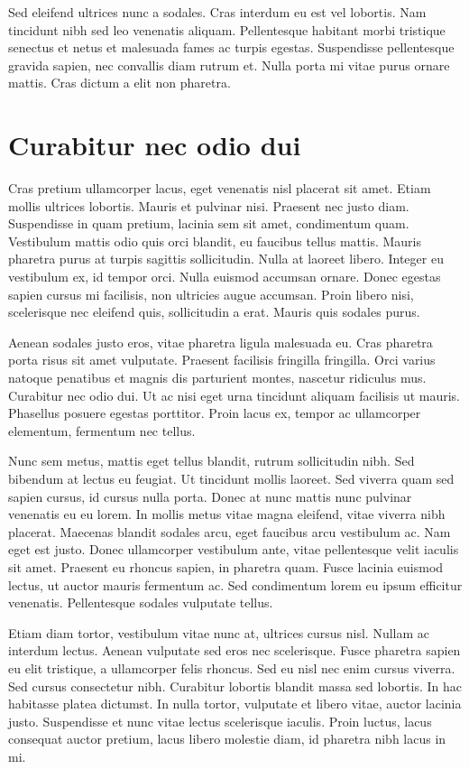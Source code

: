\documentclass[conference]{IEEEtran}
\begin{document}
Sed eleifend ultrices nunc a sodales. Cras interdum eu est vel lobortis. Nam tincidunt nibh sed leo
venenatis aliquam. Pellentesque habitant morbi tristique senectus et netus et malesuada fames ac
turpis egestas. Suspendisse pellentesque gravida sapien, nec convallis diam rutrum et. Nulla porta
mi vitae purus ornare mattis. Cras dictum a elit non pharetra.

\section{Curabitur nec odio dui}

Cras pretium ullamcorper lacus, eget venenatis nisl placerat sit amet. Etiam mollis ultrices
lobortis. Mauris et pulvinar nisi. Praesent nec justo diam. Suspendisse in quam pretium, lacinia sem
sit amet, condimentum quam. Vestibulum mattis odio quis orci blandit, eu faucibus tellus mattis.
Mauris pharetra purus at turpis sagittis sollicitudin. Nulla at laoreet libero. Integer eu
vestibulum ex, id tempor orci. Nulla euismod accumsan ornare. Donec egestas sapien cursus mi
facilisis, non ultricies augue accumsan. Proin libero nisi, scelerisque nec eleifend quis,
sollicitudin a erat. Mauris quis sodales purus.

Aenean sodales justo eros, vitae pharetra ligula malesuada eu. Cras pharetra porta risus sit amet
vulputate. Praesent facilisis fringilla fringilla. Orci varius natoque penatibus et magnis dis
parturient montes, nascetur ridiculus mus. Curabitur nec odio dui. Ut ac nisi eget urna tincidunt
aliquam facilisis ut mauris. Phasellus posuere egestas porttitor. Proin lacus ex, tempor ac
ullamcorper elementum, fermentum nec tellus.

Nunc sem metus, mattis eget tellus blandit, rutrum sollicitudin nibh. Sed bibendum at lectus eu
feugiat. Ut tincidunt mollis laoreet. Sed viverra quam sed sapien cursus, id cursus nulla porta.
Donec at nunc mattis nunc pulvinar venenatis eu eu lorem. In mollis metus vitae magna eleifend,
vitae viverra nibh placerat. Maecenas blandit sodales arcu, eget faucibus arcu vestibulum ac. Nam
eget est justo. Donec ullamcorper vestibulum ante, vitae pellentesque velit iaculis sit amet.
Praesent eu rhoncus sapien, in pharetra quam. Fusce lacinia euismod lectus, ut auctor mauris
fermentum ac. Sed condimentum lorem eu ipsum efficitur venenatis. Pellentesque sodales vulputate
tellus.

Etiam diam tortor, vestibulum vitae nunc at, ultrices cursus nisl. Nullam ac interdum lectus. Aenean
vulputate sed eros nec scelerisque. Fusce pharetra sapien eu elit tristique, a ullamcorper felis
rhoncus. Sed eu nisl nec enim cursus viverra. Sed cursus consectetur nibh. Curabitur lobortis
blandit massa sed lobortis. In hac habitasse platea dictumst. In nulla tortor, vulputate et libero
vitae, auctor lacinia justo. Suspendisse et nunc vitae lectus scelerisque iaculis. Proin luctus,
lacus consequat auctor pretium, lacus libero molestie diam, id pharetra nibh lacus in mi. 


\balance

\printbibliography
\end{document}
